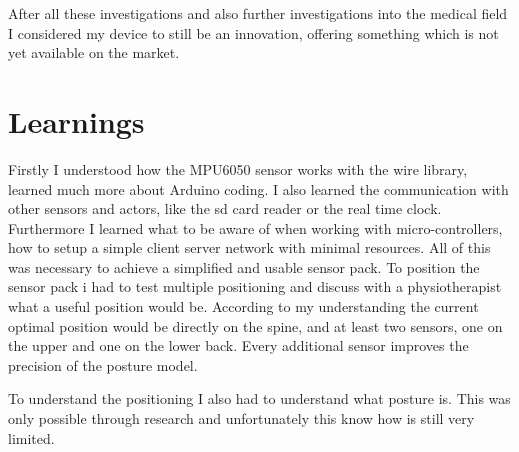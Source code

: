 After all these investigations and also further investigations into the medical field I considered my device to still be an innovation, offering something which is not yet available on the market.

\newpage

\section{Learnings}

Firstly I understood how the MPU6050 sensor works with the wire library, learned much more about Arduino coding. I also learned the communication with other sensors and actors, like the sd card reader or the real time clock. Furthermore I learned what to be aware of when working with micro-controllers, how to setup a simple client server network with minimal resources. All of this was necessary to achieve a simplified and usable sensor pack. 
To position the sensor pack i had to test multiple positioning and discuss with a physiotherapist what a useful position would be. According to my understanding the current optimal position would be directly on the spine, and at least two sensors, one on the upper and one on the lower back. Every additional sensor improves the precision of the posture model. 

To understand the positioning I also had to understand what posture is. This was only possible through research and unfortunately this know how is still very limited.